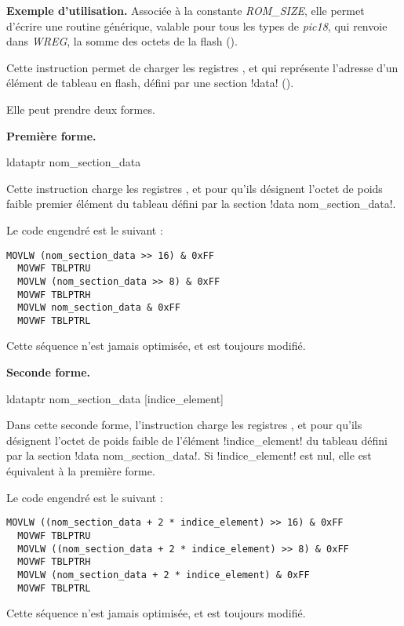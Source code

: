 \textbf{Exemple d'utilisation.} Associée à la constante \emph{ROM\_SIZE}, elle permet d'écrire une routine générique, valable pour tous les types de \emph{pic18}, qui renvoie dans \emph{WREG}, la somme des octets de la flash ().



Cette instruction permet de charger les registres ,  et  qui représente l'adresse d'un élément de tableau en flash, défini par une section \pic!data! ().

Elle peut prendre deux formes.

\textbf{Première forme.}

\begin{piccolo}
  ldataptr nom_section_data
\end{piccolo}

Cette instruction charge les registres ,  et  pour qu'ils désignent l'octet de poids faible premier élément du tableau défini par la section \pic!data nom_section_data!.

Le code engendré est le suivant :
\begin{lstlisting}[language=assembleur]
  MOVLW (nom_section_data >> 16) & 0xFF
  MOVWF TBLPTRU
  MOVLW (nom_section_data >> 8) & 0xFF
  MOVWF TBLPTRH
  MOVLW nom_section_data & 0xFF
  MOVWF TBLPTRL
\end{lstlisting}

Cette séquence n'est jamais optimisée, et  est toujours modifié.

\textbf{Seconde forme.}

\begin{piccolo}
  ldataptr nom_section_data [indice_element]
\end{piccolo}

Dans cette seconde forme, l'instruction charge les registres ,  et  pour qu'ils désignent l'octet de poids faible de l'élément \pic!indice_element! du tableau défini par la section \pic!data nom_section_data!. Si \pic!indice_element! est nul, elle est équivalent à la première forme.

Le code engendré est le suivant :
\begin{lstlisting}[language=assembleur]
  MOVLW ((nom_section_data + 2 * indice_element) >> 16) & 0xFF
  MOVWF TBLPTRU
  MOVLW ((nom_section_data + 2 * indice_element) >> 8) & 0xFF
  MOVWF TBLPTRH
  MOVLW (nom_section_data + 2 * indice_element) & 0xFF
  MOVWF TBLPTRL
\end{lstlisting}

Cette séquence n'est jamais optimisée, et  est toujours modifié.




